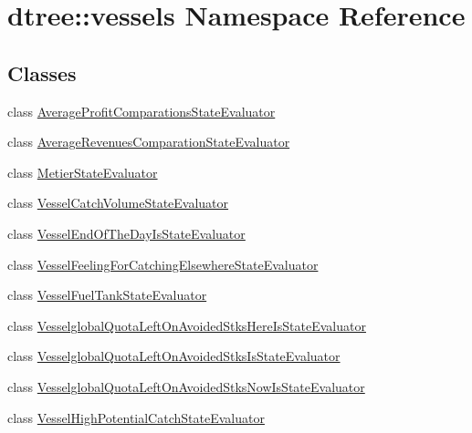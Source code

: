 \hypertarget{namespacedtree_1_1vessels}{}\section{dtree\+::vessels Namespace Reference}
\label{namespacedtree_1_1vessels}
\subsection*{Classes}
\begin{DoxyCompactItemize}
\item 
class \mbox{\hyperlink{classdtree_1_1vessels_1_1_average_profit_comparations_state_evaluator}{Average\+Profit\+Comparations\+State\+Evaluator}}
\item 
class \mbox{\hyperlink{classdtree_1_1vessels_1_1_average_revenues_comparation_state_evaluator}{Average\+Revenues\+Comparation\+State\+Evaluator}}
\item 
class \mbox{\hyperlink{classdtree_1_1vessels_1_1_metier_state_evaluator}{Metier\+State\+Evaluator}}
\item 
class \mbox{\hyperlink{classdtree_1_1vessels_1_1_vessel_catch_volume_state_evaluator}{Vessel\+Catch\+Volume\+State\+Evaluator}}
\item 
class \mbox{\hyperlink{classdtree_1_1vessels_1_1_vessel_end_of_the_day_is_state_evaluator}{Vessel\+End\+Of\+The\+Day\+Is\+State\+Evaluator}}
\item 
class \mbox{\hyperlink{classdtree_1_1vessels_1_1_vessel_feeling_for_catching_elsewhere_state_evaluator}{Vessel\+Feeling\+For\+Catching\+Elsewhere\+State\+Evaluator}}
\item 
class \mbox{\hyperlink{classdtree_1_1vessels_1_1_vessel_fuel_tank_state_evaluator}{Vessel\+Fuel\+Tank\+State\+Evaluator}}
\item 
class \mbox{\hyperlink{classdtree_1_1vessels_1_1_vesselglobal_quota_left_on_avoided_stks_here_is_state_evaluator}{Vesselglobal\+Quota\+Left\+On\+Avoided\+Stks\+Here\+Is\+State\+Evaluator}}
\item 
class \mbox{\hyperlink{classdtree_1_1vessels_1_1_vesselglobal_quota_left_on_avoided_stks_is_state_evaluator}{Vesselglobal\+Quota\+Left\+On\+Avoided\+Stks\+Is\+State\+Evaluator}}
\item 
class \mbox{\hyperlink{classdtree_1_1vessels_1_1_vesselglobal_quota_left_on_avoided_stks_now_is_state_evaluator}{Vesselglobal\+Quota\+Left\+On\+Avoided\+Stks\+Now\+Is\+State\+Evaluator}}
\item 
class \mbox{\hyperlink{classdtree_1_1vessels_1_1_vessel_high_potential_catch_state_evaluator}{Vessel\+High\+Potential\+Catch\+State\+Evaluator}}

\end{DoxyCompactItemize}
